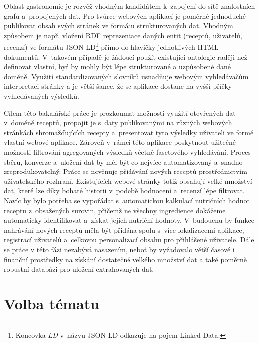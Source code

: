 Oblast gastronomie je rozvěž vhodným kandidátem k~zapojení do sítě znalostních grafů a~propojených dat. Pro tvůrce webových aplikací je poměrně jednoduché publikovat obsah svých stránek ve formátu strukturovaných dat. Vhodným způsobem je např. vložení RDF reprezentace daných entit (receptů, uživatelů, recenzí) ve formátu JSON-LD\footnote{Koncovka \emph{LD} v~názvu JSON-LD odkazuje na pojem Linked Data.} přímo do hlavičky jednotlivých HTML dokumentů. V~takovém případě je žádoucí použít existující ontologie raději než definovat vlastní, byť by mohly být lépe strukturované a uzpůsobené dané doméně. Využití standardizovaných slovníků usnadňuje webovým vyhledávačům interpretaci stránky a je větší šance, že se aplikace dostane na vyšší příčky vyhledávaných výsledků.

Cílem této bakalářské práce je prozkoumat možnosti využití otevřených dat v~doméně receptů, propojit je s~daty publikovanými na různých webových stránkách shromažďujících recepty a~prezentovat tyto výsledky uživateli ve formě vlastní webové aplikace. Zároveň v~rámci této aplikace poskytnout užitečné možnosti filtrování agregovaných výsledků včetně fasetového vyhledávání. Proces sbě\-ru, konverze a~uložení dat by měl být co nejvíce automatizovaný a~snadno zreprodukovatelný. Práce se nevěnuje přidávání nových receptů prostřednictvím uživatelského rozhraní. Existujících webové stránky totiž obsahují velké množství dat, které lze díky bohaté historii v~podobě hodnocení a~recenzí lépe filtrovat. Navíc by bylo potřeba se vypořádat s~automatickou kalkulací nutričních hodnot receptu z~obsažených surovin, přičemž ne všechny ingredience dokážeme automaticky identifikovat a~získat jejich nutriční hodnoty. V~budoucnu by funkce nahrávání nových receptů měla být přidána spolu s~více lokalizacemi aplikace, registrací uživatelů a~celkovou personalizací obsahu pro přihlášené uživatele. Dále se práce v této fázi nezabývá nasazením, neboť by vyžadovalo větší časové i finanční prostředky na získání dostatečně velkého množství dat a také poměrně robustní databázi pro uložení extrahovaných dat. 

\section*{Volba tématu}
\setcounter{tocdepth}{1}

